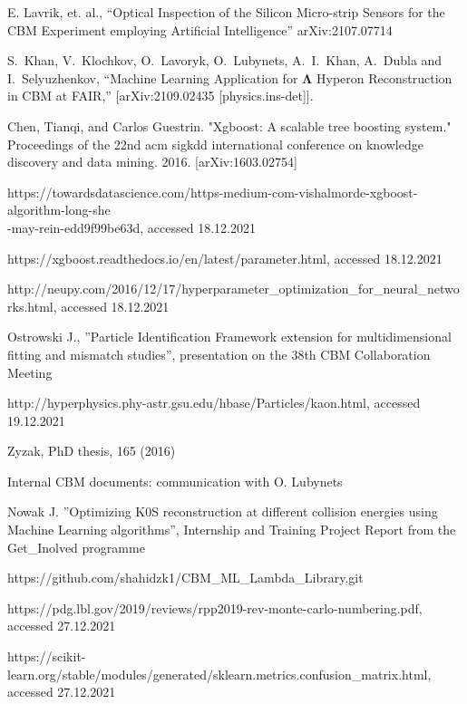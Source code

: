 \begin{thebibliography}{99}
    E. Lavrik, et. al., “Optical Inspection of the Silicon Micro-strip Sensors for the CBM Experiment employing Artificial Intelligence''
    arXiv:2107.07714

    
    S.~Khan, V.~Klochkov, O.~Lavoryk, O.~Lubynets, A.~I.~Khan, A.~Dubla and I.~Selyuzhenkov,
    ``Machine Learning Application for $\mathbf{\Lambda}$ Hyperon Reconstruction in CBM at FAIR,''
    [arXiv:2109.02435 [physics.ins-det]].
    
    Chen, Tianqi, and Carlos Guestrin. "Xgboost: A scalable tree boosting system." Proceedings of the 22nd acm sigkdd international conference on knowledge discovery and data mining. 2016.
    [arXiv:1603.02754]
    
    https://towardsdatascience.com/https-medium-com-vishalmorde-xgboost-algorithm-long-she\\-may-rein-edd9f99be63d, accessed 18.12.2021
    
    https://xgboost.readthedocs.io/en/latest/parameter.html, accessed 18.12.2021
    
    http://neupy.com/2016/12/17/hyperparameter\_optimization\_for\_neural\_networks.html, accessed 18.12.2021
    
    Ostrowski J., ''Particle Identification Framework extension for multidimensional fitting and mismatch studies'', presentation on the 38th CBM Collaboration Meeting
    
    http://hyperphysics.phy-astr.gsu.edu/hbase/Particles/kaon.html, accessed 19.12.2021
    
    Zyzak, PhD thesis, 165 (2016)
    
    Internal CBM documents: communication with O. Lubynets
    
    Nowak J. ''Optimizing K0S reconstruction at different collision energies using Machine Learning algorithms'', Internship and Training Project Report from the Get\_Inolved programme
    
    https://github.com/shahidzk1/CBM\_ML\_Lambda\_Library.git
    
    https://pdg.lbl.gov/2019/reviews/rpp2019-rev-monte-carlo-numbering.pdf, accessed 27.12.2021
    
     https://scikit-learn.org/stable/modules/generated/sklearn.metrics.confusion\_matrix.html, accessed 27.12.2021
    

 


\end{thebibliography}
